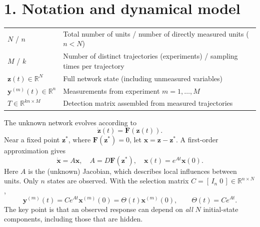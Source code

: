 \documentclass[10pt,a4paper]{article}
\begin{document}
\section{1. Notation and dynamical model}
\begin{center}
\small
\begin{tabular}{@{}ll@{} }
\toprule
$N$ / $n$ & Total number of units / number of directly measured units ($n<N$) \\
$M$ / $k$ & Number of distinct trajectories (experiments) / sampling times per trajectory \\
$\mathbf z(t)\in\mathbb R^N$ & Full network state (including unmeasured variables) \\
$\mathbf y^{(m)}(t)\in\mathbb R^n$ & Measurements from experiment $m=1,\ldots,M$ \\
$T\in\mathbb R^{kn\times M}$ & Detection matrix assembled from measured trajectories \\
\bottomrule
\end{tabular}
\end{center}
The unknown network evolves according to
\begin{equation}
  \dot{\mathbf z}(t)=\mathbf F(\mathbf z(t)). \tag{1}
\end{equation}
Near a fixed point $\mathbf z^*$, where $\mathbf F(\mathbf z^*)=0$, let
$\mathbf x=\mathbf z-\mathbf z^*$. A first-order approximation gives
\begin{equation}
  \dot{\mathbf x}=A\mathbf x,\quad
  A= D\mathbf F(\mathbf z^*),\quad
  \mathbf x(t)=e^{At}\mathbf x(0). \tag{2}
\end{equation}
Here $A$ is the (unknown) Jacobian, which describes local influences between units.
Only $n$ states are observed. With the selection matrix
$C=[\,I_n\;0\,]\in\mathbb R^{n\times N}$,
\begin{equation}
  \mathbf y^{(m)}(t)=C e^{At}\mathbf x^{(m)}(0)
  =\Theta(t)\mathbf x^{(m)}(0),\qquad \Theta(t)=Ce^{At}. \tag{3}
\end{equation}
The key point is that an observed response can depend on \emph{all} $N$ initial-state components, including those that are hidden.
\end{document}
